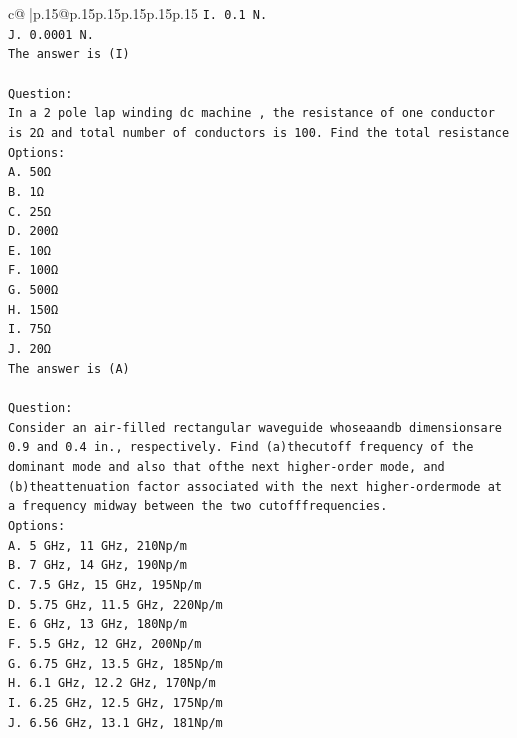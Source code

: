 \documentclass{article}
\begin{document}
{\begin{supertabular}{c@{$\;$}|p{.15\linewidth}@{}p{.15\linewidth}p{.15\linewidth}p{.15\linewidth}p{.15\linewidth}p{.15\linewidth}}
{{{\texttt{I. 0.1 N.} \\
\texttt{J. 0.0001 N.} \\
\texttt{The answer is (I)} \\
\\ 
\texttt{Question:} \\
\texttt{In a 2 pole lap winding dc machine , the resistance of one conductor is 2Ω and total number of conductors is 100. Find the total resistance} \\
\texttt{Options:} \\
\texttt{A. 50Ω} \\
\texttt{B. 1Ω} \\
\texttt{C. 25Ω} \\
\texttt{D. 200Ω} \\
\texttt{E. 10Ω} \\
\texttt{F. 100Ω} \\
\texttt{G. 500Ω} \\
\texttt{H. 150Ω} \\
\texttt{I. 75Ω} \\
\texttt{J. 20Ω} \\
\texttt{The answer is (A)} \\
\\ 
\texttt{Question:} \\
\texttt{Consider an air{-}filled rectangular waveguide whoseaandb dimensionsare 0.9 and 0.4 in., respectively. Find (a)thecutoff frequency of the dominant mode and also that ofthe next higher{-}order mode, and (b)theattenuation factor associated with the next higher{-}ordermode at a frequency midway between the two cutofffrequencies.} \\
\texttt{Options:} \\
\texttt{A. 5 GHz, 11 GHz, 210Np/m} \\
\texttt{B. 7 GHz, 14 GHz, 190Np/m} \\
\texttt{C. 7.5 GHz, 15 GHz, 195Np/m} \\
\texttt{D. 5.75 GHz, 11.5 GHz, 220Np/m} \\
\texttt{E. 6 GHz, 13 GHz, 180Np/m} \\
\texttt{F. 5.5 GHz, 12 GHz, 200Np/m} \\
\texttt{G. 6.75 GHz, 13.5 GHz, 185Np/m} \\
\texttt{H. 6.1 GHz, 12.2 GHz, 170Np/m} \\
\texttt{I. 6.25 GHz, 12.5 GHz, 175Np/m} \\
\texttt{J. 6.56 GHz, 13.1 GHz, 181Np/m} \\
            }
        }
    }
     \\ \\


\end{supertabular}}
\end{document}
